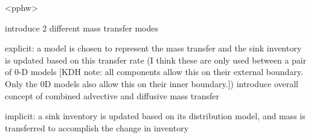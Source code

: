 <pphw>

  introduce 2 different mass transfer modes

  explicit: a model is chosen to represent the mass transfer and the sink 
  inventory is updated based on this transfer rate (I think these are only used 
  between a pair of 0-D models [KDH note: all components allow this on their 
  external boundary. Only the 0D models also allow this on their inner 
  boundary.]) introduce overall concept of combined advective and diffusive mass transfer

  implicit: a sink inventory is updated based on its distribution model, and 
  mass is transferred to accomplish the change in inventory


